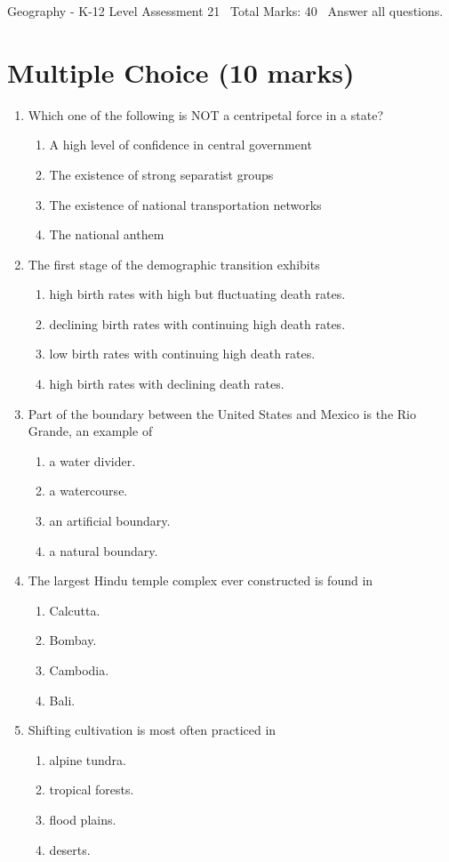 \documentclass[12pt]{article}
\begin{document}
\begin{center}
Geography - K-12 Level Assessment 21 \
Total Marks: 40 \
Answer all questions.
\end{center}

\section*{Multiple Choice (10 marks)}
\begin{enumerate}[label=\arabic*.]
\item Which one of the following is NOT a centripetal force in a state?
\begin{enumerate}[label=(\alph*)]
    \item A high level of confidence in central government
    \item The existence of strong separatist groups
    \item The existence of national transportation networks
    \item The national anthem
\end{enumerate}
\item The first stage of the demographic transition exhibits
\begin{enumerate}[label=(\alph*)]
    \item high birth rates with high but fluctuating death rates.
    \item declining birth rates with continuing high death rates.
    \item low birth rates with continuing high death rates.
    \item high birth rates with declining death rates.
\end{enumerate}
\item Part of the boundary between the United States and Mexico is the Rio Grande, an example of
\begin{enumerate}[label=(\alph*)]
    \item a water divider.
    \item a watercourse.
    \item an artificial boundary.
    \item a natural boundary.
\end{enumerate}
\item The largest Hindu temple complex ever constructed is found in
\begin{enumerate}[label=(\alph*)]
    \item Calcutta.
    \item Bombay.
    \item Cambodia.
    \item Bali.
\end{enumerate}
\item Shifting cultivation is most often practiced in
\begin{enumerate}[label=(\alph*)]
    \item alpine tundra.
    \item tropical forests.
    \item flood plains.
    \item deserts.
\end{enumerate}
\end{enumerate}
\end{document}

